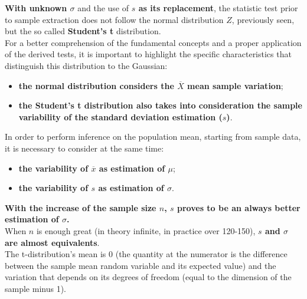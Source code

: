 \begin{frame}
  \textbf{With unknown {\boldmath $ \sigma $}} and the use of \textbf{{\boldmath $ s $} as its replacement}, the statistic test prior to sample extraction does not follow the normal distribution $ Z $, previously seen, but the so called \textbf{Student's t} distribution.\\
  \vspace*{.5cm}
  For a better comprehension of the fundamental concepts and a proper application of the derived tests, it is important to highlight the specific characteristics that distinguish this distribution to the Gaussian:\\
  \begin{itemize}
    \item \textbf{the normal distribution considers the {\boldmath $ \overline{X} $} mean sample variation};
    \item \textbf{the Student's t distribution also takes into consideration the sample variability of the standard deviation estimation ({\boldmath $ s $})}.\\
  \end{itemize}
\end{frame}

\begin{frame}
  In order to perform inference on the population mean, starting from sample data, it is necessary to consider at the same time:\\
  \begin{itemize}
    \item \textbf{the variability of {\boldmath $ \overline{x} $} as estimation of {\boldmath $ \mu $}};
    \item \textbf{the variability of {\boldmath $ s $} as estimation of {\boldmath $ \sigma $}}.
  \end{itemize}
  \textbf{With the increase of the sample size {\boldmath $ n $}, {\boldmath $ s $} proves to be an always better estimation of {\boldmath $ \sigma $}.}\\
  \vspace*{.15cm}
  When {\boldmath $ n $} is enough great (in theory infinite, in practice over 120-150), \textbf{{\boldmath $ s $} and {\boldmath $ \sigma $} are almost equivalents}.\\
  \vspace*{.15cm}
  The t-distribution's mean  is 0 (the quantity at the numerator is the difference between the sample mean random variable and its expected value) and the variation that depends on its degrees of freedom (equal to the dimension of the sample minus 1).                                                                                                                                                                                                                                                     
\end{frame}

